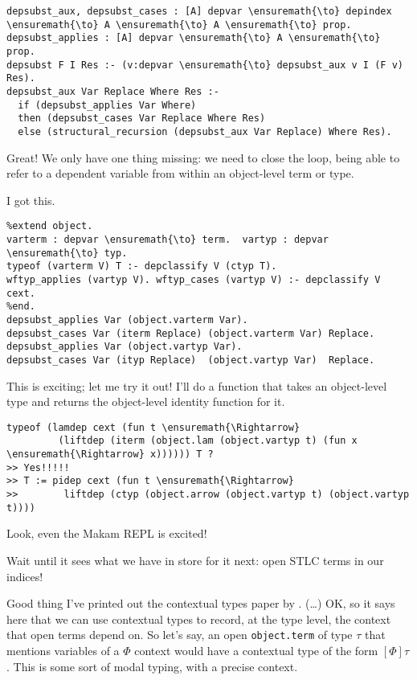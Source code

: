 \begin{verbatim}
depsubst_aux, depsubst_cases : [A] depvar \ensuremath{\to} depindex \ensuremath{\to} A \ensuremath{\to} A \ensuremath{\to} prop.
depsubst_applies : [A] depvar \ensuremath{\to} A \ensuremath{\to} prop.
depsubst F I Res :- (v:depvar \ensuremath{\to} depsubst_aux v I (F v) Res).
depsubst_aux Var Replace Where Res :-
  if (depsubst_applies Var Where)
  then (depsubst_cases Var Replace Where Res)
  else (structural_recursion (depsubst_aux Var Replace) Where Res).
\end{verbatim}

\heroADVISOR{} Great! We only have one thing missing: we need to close the
loop, being able to refer to a dependent variable from within an
object-level term or type.

\heroSTUDENT{} I got this.

\begin{verbatim}
%extend object.
varterm : depvar \ensuremath{\to} term.  vartyp : depvar \ensuremath{\to} typ.
typeof (varterm V) T :- depclassify V (ctyp T).
wftyp_applies (vartyp V). wftyp_cases (vartyp V) :- depclassify V cext.
%end.
depsubst_applies Var (object.varterm Var).
depsubst_cases Var (iterm Replace) (object.varterm Var) Replace.
depsubst_applies Var (object.vartyp Var).
depsubst_cases Var (ityp Replace)  (object.vartyp Var)  Replace.
\end{verbatim}

\heroADVISOR{} This is exciting; let me try it out! I'll do a function that
takes an object-level type and returns the object-level identity
function for it.

\begin{verbatim}
typeof (lamdep cext (fun t \ensuremath{\Rightarrow}
         (liftdep (iterm (object.lam (object.vartyp t) (fun x \ensuremath{\Rightarrow} x)))))) T ?
>> Yes!!!!!
>> T := pidep cext (fun t \ensuremath{\Rightarrow}
>>        liftdep (ctyp (object.arrow (object.vartyp t) (object.vartyp t))))
\end{verbatim}

\heroSTUDENT{} Look, even the Makam REPL is excited!

\heroADVISOR{} Wait until it sees what we have in store for it next: open STLC
terms in our indices!

\heroSTUDENT{} Good thing I've printed out the contextual types paper by
\citet{nanevski2008contextual}. (\ldots{}) OK, so it says here that we
can use contextual types to record, at the type level, the context that
open terms depend on. So let's say, an open \texttt{object.term} of type
\(\tau\) that mentions variables of a \(\Phi\) context would have a
contextual type of the form \([\Phi] \tau\). This is some sort of modal
typing, with a precise context.

